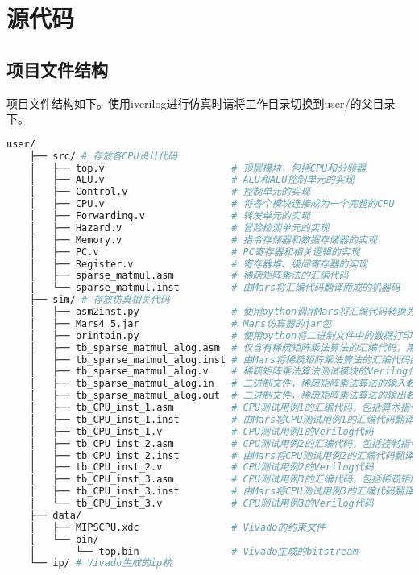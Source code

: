\section{源代码}

\subsection{项目文件结构}
\label{subsec:project-structure}
项目文件结构如下。使用iverilog进行仿真时请将工作目录切换到user/的父目录下。
\begin{lstlisting}[language={bash}, numbers=none]
    user/
    ├── src/ # 存放各CPU设计代码
    │   ├── top.v                      # 顶层模块，包括CPU和分频器
    │   ├── ALU.v                      # ALU和ALU控制单元的实现
    │   ├── Control.v                  # 控制单元的实现
    │   ├── CPU.v                      # 将各个模块连接成为一个完整的CPU
    │   ├── Forwarding.v               # 转发单元的实现
    │   ├── Hazard.v                   # 冒险检测单元的实现
    │   ├── Memory.v                   # 指令存储器和数据存储器的实现
    │   ├── PC.v                       # PC寄存器和相关逻辑的实现
    │   ├── Register.v                 # 寄存器堆、级间寄存器的实现
    │   ├── sparse_matmul.asm          # 稀疏矩阵乘法的汇编代码
    │   └── sparse_matmul.inst         # 由Mars将汇编代码翻译而成的机器码
    ├── sim/ # 存放仿真相关代码
    │   ├── asm2inst.py                # 使用python调用Mars将汇编代码转换为机器码
    │   ├── Mars4_5.jar                # Mars仿真器的jar包
    │   ├── printbin.py                # 使用python将二进制文件中的数据打印出来
    │   ├── tb_sparse_matmul_alog.asm  # 仅含有稀疏矩阵乘法算法的汇编代码，用于统计指令数
    │   ├── tb_sparse_matmul_alog.inst # 由Mars将稀疏矩阵乘法算法的汇编代码翻译成的机器码
    │   ├── tb_sparse_matmul_alog.v    # 稀疏矩阵乘法算法测试模块的Verilog代码
    │   ├── tb_sparse_matmul_alog.in   # 二进制文件，稀疏矩阵乘法算法的输入数据
    │   ├── tb_sparse_matmul_alog.out  # 二进制文件，稀疏矩阵乘法算法的输出数据
    │   ├── tb_CPU_inst_1.asm          # CPU测试用例1的汇编代码，包括算术指令和转发
    │   ├── tb_CPU_inst_1.inst         # 由Mars将CPU测试用例1的汇编代码翻译成的机器码
    │   ├── tb_CPU_inst_1.v            # CPU测试用例1的Verilog代码
    │   ├── tb_CPU_inst_2.asm          # CPU测试用例2的汇编代码，包括控制指令和冒险
    │   ├── tb_CPU_inst_2.inst         # 由Mars将CPU测试用例2的汇编代码翻译成的机器码
    │   ├── tb_CPU_inst_2.v            # CPU测试用例2的Verilog代码
    │   ├── tb_CPU_inst_3.asm          # CPU测试用例3的汇编代码，包括稀疏矩阵乘法和BCD7显示
    │   ├── tb_CPU_inst_3.inst         # 由Mars将CPU测试用例3的汇编代码翻译成的机器码
    │   └── tb_CPU_inst_3.v            # CPU测试用例3的Verilog代码
    ├── data/
    │   ├── MIPSCPU.xdc                # Vivado的约束文件
    │   └── bin/
    │       └── top.bin                # Vivado生成的bitstream
    └── ip/ # Vivado生成的ip核
\end{lstlisting}

